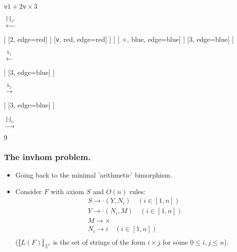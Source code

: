 \documentclass{beamer}
\begin{document}
\begin{frame}
\begin{center}
      \fontsize{6}{7}      
      \begin{minipage}{0.1\linewidth}
        $\texttt{v} 1 + 2\texttt{v} \times 3$
      \end{minipage}
    $\xleftarrow{\llbracket \cdot \rrbracket_{\Sigma^{\ast}}}$
    \begin{minipage}{0.18\linewidth}
	      \centering
	      \begin{forest}
      	      [$\cdot$, blue [$\cdot$, blue, edge=blue [ $\cdot$, red, edge=blue [ \texttt{v}, red, edge=red ] [$\cdot$, red, edge=red [$\cdot$, red, edge=red [$\cdot$, red, edge=red [1, edge=red] [+, red, edge=red]] [2, edge=red] ] [\texttt{v}, red, edge=red] ]  ] [ $\times$, blue, edge=blue] ] [3, edge=blue] ]
           \end{forest}
      \end{minipage}
      $\xleftarrow{h_1}$      
	  \begin{minipage}{0.1\linewidth}
		  \centering
		  \begin{forest}
		    [$r_{m}$, blue [ $r_{a}$, red, edge=blue [$1$, edge=red] [$2$, edge=red] ] [$3$, edge=blue] ] 
		  \end{forest}
	  \end{minipage}
      $\xrightarrow{h_2}$
      \begin{minipage}{0.18\linewidth}
      	\centering
      	\begin{forest}
      		[\texttt{mul}, blue [ \texttt{add},red, edge=blue [$1$, edge=red] [$2$, edge=red] ]  [$3$, edge=blue] ]
      	\end{forest}
      \end{minipage}
      $\xrightarrow{\llbracket \cdot \rrbracket_{\mathbb{N}}}$
      \begin{minipage}{0.05\linewidth}
      	\centering
      	$9$
      \end{minipage}
    \end{center}
\end{frame}

\begin{frame}
  \frametitle{The invhom problem.}

  \begin{itemize}
  \item Going back to the minimal 'arithmetic' bimorphism.
  \item Consider $F$ with axiom $S$ and $O(n)$ rules:
    \[
    \begin{aligned}
      & S \rightarrow \cdot(Y, N_i) \quad (i \in [1,n])\\
      & Y \rightarrow \cdot(N_i, M) \quad (i \in [1,n])\\
      & M \rightarrow \times\\
      & N_i \rightarrow i \quad (i \in [1,n])\\ 
    \end{aligned}    
    \]
    ($\llbracket L(F) \rrbracket_{\Sigma^\ast}$ is the set of strings of the form $i \times j$ for some $0 \le i,j \le n $).
  \end{itemize}
\end{frame}
\end{document}
